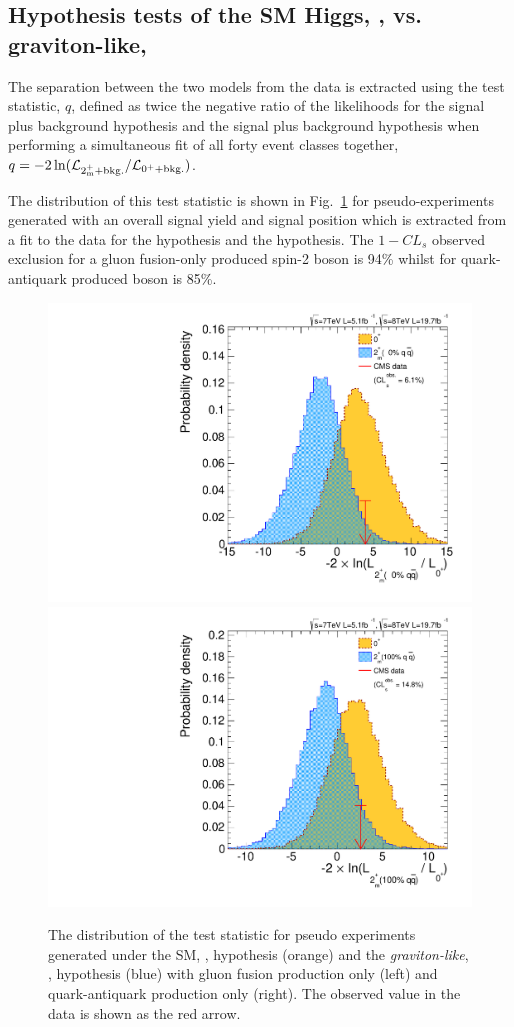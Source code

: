 \subsection{Hypothesis tests of the SM Higgs, \zerop, vs. graviton-like, \twomp}
\label{sec:spin_separation}

The separation between the two models from the data is extracted using the test statistic, $q$, defined as twice the negative ratio 
of the likelihoods for the \zerop signal plus background hypothesis and the \twomp signal plus background hypothesis when 
performing a simultaneous fit of all forty event classes together, $q=-2\,{\ln({\cal L}_{2^{+}_\mathrm{m} + \mathrm{bkg.}}/{\cal
L}_{0^+ + \mathrm{bkg.}})}$.

The distribution of this test statistic is shown in 
Fig.~\ref{fig:separation} for pseudo-experiments generated with an overall signal yield and signal position which is extracted from a fit to the data for
the \zerop hypothesis 
and the \twomp hypothesis. The $1-CL_{s}$ observed exclusion for a gluon fusion-only produced spin-2 boson is 94\% whilst for quark-antiquark produced boson is 85\%. 

\begin{figure}
  \begin{center}
    \includegraphics[width=0.49\linewidth]{results/plots/2pm0.pdf}
    \includegraphics[width=0.49\linewidth]{results/plots/2pm1.pdf}
    \caption[Distributions of the test statistic for different spin hypotheses compared to the \acs{SM}]{The distribution of the test statistic for pseudo experiments generated under the SM, \zerop, hypothesis (orange) and the \emph{graviton-like}, \twomp, hypothesis (blue) with gluon fusion production only (left) and quark-antiquark production only (right). The observed value in the data is shown as the red arrow.}
    \label{fig:separation}
  \end{center}
\end{figure}

